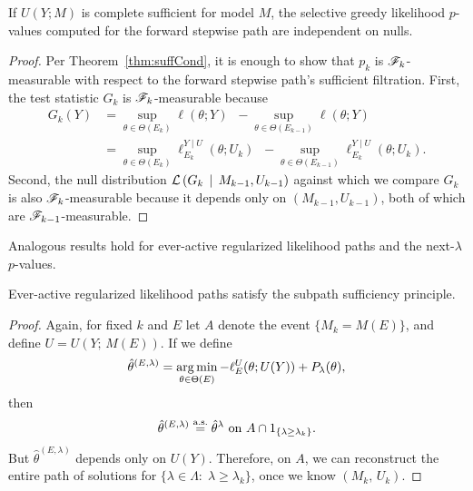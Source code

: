 \documentclass{article}
\begin{document}
\begin{corollary}\label{cor:greedyLikIndep}
  If $U(Y; M)$ is complete sufficient for model $M$, the selective greedy likelihood $p$-values computed for the forward stepwise path are independent on nulls.
\end{corollary}
\begin{proof}
  Per Theorem~\ref{thm:suffCond}, it is enough to show that $p_k$ is $\mathscr{F}_k$-measurable with respect to the forward stepwise path's sufficient filtration. First, the test statistic $G_k$ is $\mathscr{F}_k$-measurable because
  \begin{align*}
    G_k(Y) &= \sup_{\theta\in \Theta(E_k)} {\ell(\theta; Y)} \;\;- \sup_{\theta\in \Theta(E_{k-1})} {\ell(\theta; Y)}\\
    &= \sup_{\theta\in \Theta(E_k)} {\ell_{E_k}^{Y\mid U}(\theta; U_k)} \;\;- \sup_{\theta\in \Theta(E_{k-1})} {\ell_{E_k}^{Y\mid U}(\theta; U_k)}.
  \end{align*}
  Second, the null distribution $\mathcal{L}\left(G_k \,\mid\, M_{k-1}, U_{k-1}\right)$ against which we compare $G_k$ is also $\mathscr{F}_k$-measurable because it depends only on $(M_{k-1}, U_{k-1})$, both of which are $\mathscr{F}_{k-1}$-measurable.
\end{proof}

Analogous results hold for ever-active regularized likelihood paths and the next-$\lambda$ $p$-values.

\begin{proposition}\label{prop:regPathSSP}
Ever-active regularized likelihood paths satisfy the
subpath sufficiency principle.
\end{proposition}

\begin{proof}
  Again, for fixed $k$ and $E$ let $A$ denote the event $\{M_k = M(E)\}$, and define $U=U(Y;\, M(E))$. If we define
\[
\hat\theta^{(E,\lambda)} = \operatorname*{arg\,min}_{\theta\in\Theta(E)} -\ell_E^{U}(\theta; U(Y)) + P_\lambda(\theta),
\]
then 
\[
\hat\theta^{(E,\lambda)} \overset{\textrm{a.s.}}{=} \hat\theta^{\lambda} \text{ on } 
A \cap 1_{\{\lambda \geq \lambda_k\}}.
\]
But $\hat\theta^{(E,\lambda)}$ depends only on $U(Y)$. Therefore, on $A$, we can reconstruct the entire path of solutions for $\{\lambda\in \Lambda:\; \lambda\geq \lambda_k\}$, once we know $(M_k,\,U_k)$.
\end{proof}
\end{document}
